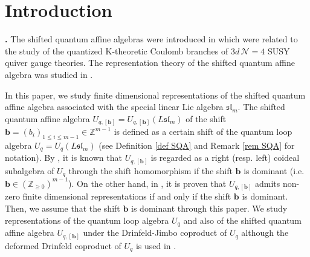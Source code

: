 \documentclass[12pt]{amsart}
\def \para{\refstepcounter{thm} \par\medskip\noindent
                \textbf{\thethm .} }
\numberwithin{equation}{thm}
\newcommand\ZZ{\mathbb Z}
\newcommand\bb{\mathbf b}
\newcommand\cN{\mathcal{N}}
\newcommand\Fsl{\mathfrak{sl}}
\newcounter{ni}
\begin{document}
\begin{abstract}
In this paper, we study finite dimensional representations of shifted quantum affine algebras of type $A$. 
We give an explicit description of the tensor product of simple evaluation modules of the quantum loop algebra 
and a one-dimensional representation of the shifted quantum affine algebra under the separation condition. 
As a consequence,  we give the $q$-characters of some finite dimensional simple modules of the shifted quantum affine algebra.  
\end{abstract}

\tableofcontents 

\section{Introduction} 

\para 
The shifted quantum affine algebras were introduced in \cite{FT19} 
which were related to the study of the quantized K-theoretic Coulomb branches of $3d \, \cN= 4$ SUSY quiver gauge theories. 
The representation theory of the shifted quantum affine algebra was studied in \cite{Her23}.  

In this paper, we study finite dimensional representations of the shifted quantum affine algebra 
associated with the special linear Lie algebra $\Fsl_m$. 
The shifted quantum affine algebra $U_{q,[\bb]}=U_{q,[\bb]} (L\Fsl_m)$ of the shift $\bb=(b_i)_{1 \leq i \leq m-1} \in \ZZ^{m-1}$ 
is defined as a certain shift of the quantum loop algebra $U_q=U_q (L \Fsl_m)$ 
(see Definition \ref{def SQA} and Remark \ref{rem SQA} for notation).  
By \cite{FT19}, it is known that $U_{q,[\bb]}$ is regarded as a right (resp. left) coideal subalgebra of $U_q $ 
through the shift homomorphism if the shift $\bb$ is dominant (i.e. $\bb \in (\ZZ_{\geq 0})^{m-1}$).
On the other hand, in \cite{Her23}, it is proven that $U_{q,[\bb]}$ admits non-zero finite dimensional representations 
if and only if the shift $\bb$ is dominant. 
Then, we assume that the shift $\bb$ is dominant through this paper. 
We study representations of the quantum loop algebra $U_q$ and also of the shifted quantum affine algebra 
$U_{q,[\bb]}$ under the Drinfeld-Jimbo coproduct of $U_q $ 
although the deformed Drinfeld coproduct of $U_q $ is used in \cite{Her23}. 
\end{document}
